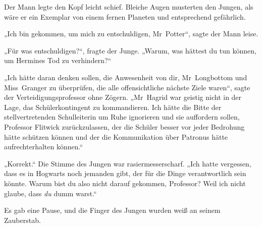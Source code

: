 Der Mann legte den Kopf leicht schief. Bleiche Augen musterten den Jungen, als wäre er ein Exemplar von einem fernen Planeten und entsprechend gefährlich.

„Ich bin gekommen, um mich zu entschuldigen, Mr~Potter“, sagte der Mann leise.

„Für was entschuldigen?“, fragte der Junge. „Warum, was hättest du tun können, um Hermines Tod zu verhindern?“

„Ich hätte daran denken sollen, die Anwesenheit von dir, Mr~Longbottom und Miss~Granger zu überprüfen, die alle offensichtliche nächste Ziele waren“, sagte der Verteidigungsprofessor ohne Zögern. „Mr~Hagrid war geistig nicht in der Lage, das Schülerkontingent zu kommandieren. Ich hätte die Bitte der stellvertretenden Schulleiterin um Ruhe ignorieren und sie auffordern sollen, Professor Flitwick zurückzulassen, der die Schüler besser vor jeder Bedrohung hätte schützen können und der die Kommunikation über Patronus hätte aufrechterhalten können.“

„Korrekt.“ Die Stimme des Jungen war rasiermesserscharf. „Ich hatte vergessen, dass es in Hogwarts noch jemanden gibt, der für die Dinge verantwortlich sein könnte. Warum bist du also nicht darauf gekommen, Professor? Weil ich nicht glaube, dass \emph{du} dumm warst.“

Es gab eine Pause, und die Finger des Jungen wurden weiß an seinem Zauberstab.

